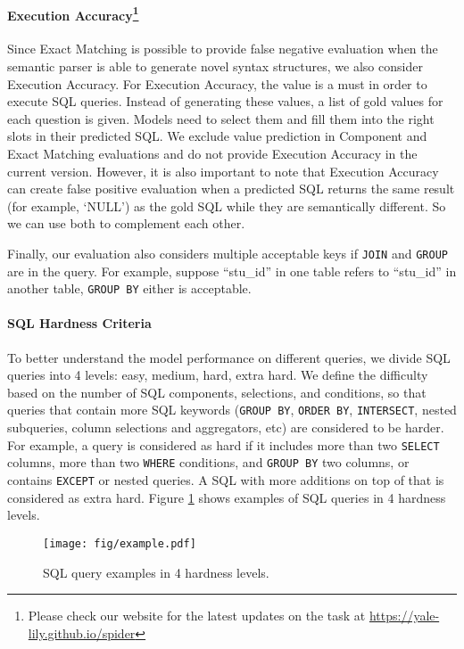 \documentclass[11pt,a4paper]{article}
\begin{document}
\paragraph{Execution Accuracy\footnote{Please check our website for the latest updates on the task at \url{https://yale-lily.github.io/spider}}}
Since Exact Matching is possible to provide false negative evaluation when the semantic parser is able to generate novel syntax structures, we also consider Execution Accuracy.
For Execution Accuracy, the value is a must in order to execute SQL queries. Instead of generating these values, a list of gold values for each question is given. Models need to select them and fill them into the right slots in their predicted SQL.
We exclude value prediction in Component and Exact Matching evaluations and do not provide Execution Accuracy in the current version. 
However, it is also important to note that Execution Accuracy can create false positive evaluation when a predicted SQL returns the same result (for example, `NULL') as the gold SQL while they are semantically different.
So we can use both to complement each other.


Finally, our evaluation also considers multiple acceptable keys if \texttt{JOIN} and \texttt{GROUP} are in the query. For example, suppose ``stu\_id'' in one table refers to ``stu\_id'' in another table, \texttt{GROUP BY} either is acceptable.

\iffalse 

\fi 

\paragraph{SQL Hardness Criteria} 
To better understand the model performance on different queries, we divide SQL queries into 4 levels: easy, medium, hard, extra hard.
We define the difficulty based on the number of SQL components, selections, and conditions, so that queries that contain more SQL keywords (\texttt{GROUP BY}, \texttt{ORDER BY}, \texttt{INTERSECT}, nested subqueries, column selections and aggregators, etc) are considered to be harder.
For example, a query is considered as hard if it includes more than two \texttt{SELECT} columns, more than two \texttt{WHERE} conditions, and \texttt{GROUP BY} two columns, or contains \texttt{EXCEPT} or nested queries. A SQL with more additions on top of that is considered as extra hard.
Figure \ref{fig:example} shows examples of SQL queries in 4 hardness levels.
\begin{figure}[!t]
    \centering
    \texttt{[image: fig/example.pdf]}
    \caption{SQL query examples in 4 hardness levels.}
\label{fig:example}
\end{figure}
\end{document}
